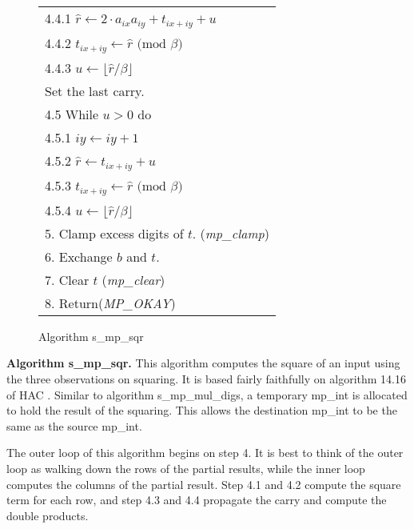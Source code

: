 \documentclass[b5paper]{book}
\begin{document}
\begin{figure}[!here]
\begin{small}
\begin{center}
\begin{tabular}{l}
\hspace{6mm}4.4.1  $\hat r \leftarrow 2 \cdot a_{ix}a_{iy} + t_{ix + iy} + u$ \\
\hspace{6mm}4.4.2  $t_{ix + iy} \leftarrow \hat r \mbox{ (mod }\beta\mbox{)}$ \\
\hspace{6mm}4.4.3  $u \leftarrow \lfloor \hat r / \beta \rfloor$ \\
\hspace{3mm}Set the last carry. \\
\hspace{3mm}4.5  While $u > 0$ do \\
\hspace{6mm}4.5.1  $iy \leftarrow iy + 1$ \\
\hspace{6mm}4.5.2  $\hat r \leftarrow t_{ix + iy} + u$ \\
\hspace{6mm}4.5.3  $t_{ix + iy} \leftarrow \hat r \mbox{ (mod }\beta\mbox{)}$ \\
\hspace{6mm}4.5.4  $u \leftarrow \lfloor \hat r / \beta \rfloor$ \\
5.  Clamp excess digits of $t$.  (\textit{mp\_clamp}) \\
6.  Exchange $b$ and $t$. \\
7.  Clear $t$ (\textit{mp\_clear}) \\
8.  Return(\textit{MP\_OKAY}) \\
\hline
\end{tabular}
\end{center}
\end{small}
\caption{Algorithm s\_mp\_sqr}
\end{figure}

\textbf{Algorithm s\_mp\_sqr.}
This algorithm computes the square of an input using the three observations on squaring.  It is based fairly faithfully on  algorithm 14.16 of HAC
\cite[pp.596-597]{HAC}.  Similar to algorithm s\_mp\_mul\_digs, a temporary mp\_int is allocated to hold the result of the squaring.  This allows the 
destination mp\_int to be the same as the source mp\_int.

The outer loop of this algorithm begins on step 4. It is best to think of the outer loop as walking down the rows of the partial results, while
the inner loop computes the columns of the partial result.  Step 4.1 and 4.2 compute the square term for each row, and step 4.3 and 4.4 propagate
the carry and compute the double products.  
\end{document}
